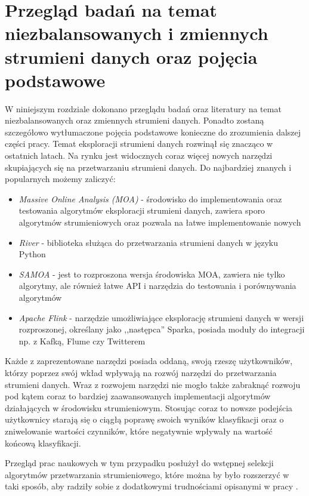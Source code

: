 \chapter{Przegląd badań na temat niezbalansowanych i zmiennych strumieni danych oraz pojęcia podstawowe}

\noindent W niniejszym rozdziale dokonano przeglądu badań oraz literatury na temat niezbalansowanych oraz zmiennych strumieni danych. Ponadto zostaną szczegółowo wytłumaczone pojęcia podstawowe konieczne do zrozumienia dalszej części pracy. Temat eksploracji strumieni danych rozwinął się znacząco w ostatnich latach. Na rynku jest widocznych coraz więcej nowych narzędzi skupiających się na przetwarzaniu strumieni danych. Do najbardziej znanych i popularnych możemy zaliczyć:

\begin{itemize}
    \item \textit{Massive Online Analysis (MOA)} - środowisko do implementowania oraz testowania algorytmów eksploracji strumieni danych, zawiera sporo algorytmów strumieniowych oraz pozwala na łatwe implementowanie nowych \cite{Article:MOA}
    \item \textit{River} - biblioteka służąca do przetwarzania strumieni danych w języku Python \cite{Article:River}
    \item \textit{SAMOA} - jest to rozproszona wersja środowiska MOA, zawiera nie tylko algorytmy, ale również łatwe API i narzędzia do testowania i porównywania algorytmów \cite{Article:Samoa}
    \item \textit{Apache Flink} - narzędzie umożliwiające eksplorację strumieni danych w wersji rozproszonej, określany jako ,,następca'' Sparka, posiada moduły do integracji np. z Kafką, Flume czy Twitterem \cite{Article:Flink}
\end{itemize}

\noindent Każde z zaprezentowane narzędzi posiada oddaną, swoją rzeszę użytkowników, którzy poprzez swój wkład wpływają na rozwój narzędzi do przetwarzania strumieni danych. Wraz z rozwojem narzędzi nie mogło także zabraknąć rozwoju pod kątem coraz to bardziej zaawansowanych implementacji algorytmów działających w środowisku strumieniowym. Stosując coraz to nowsze podejścia użytkownicy starają się o ciągłą poprawę swoich wyników klasyfikacji oraz o zniwelowanie wartości czynników, które negatywnie wpływały na wartość końcową klasyfikacji. 

Przegląd prac naukowych w tym przypadku posłużył do wstępnej selekcji algorytmów przetwarzania strumieniowego, które można by było rozszerzyć w taki sposób, aby radziły sobie z dodatkowymi trudnościami opisanymi w pracy \cite{Article:TypyPrzykladow}.


